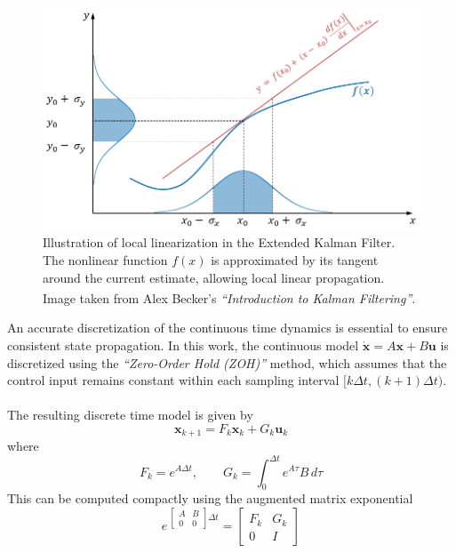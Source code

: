 \begin{figure}[H]
    \centering
    \includegraphics[width=1.0\linewidth]{Pictures/State_Estimation/Extended_Kalman_Filter/Extended_Kalman_Filter_Illustrated.png}
    \caption{Illustration of local linearization in the Extended Kalman Filter. The nonlinear function $f(x)$ is approximated by its tangent around the current estimate, allowing local linear propagation. Image taken from Alex Becker's \textit{``Introduction to Kalman Filtering''}.\textsuperscript{\cite{extended_kalman_filter}}}
    \label{fig:state-estimation-extended-kalman-filter}
\end{figure}
\noindent
An accurate discretization of the continuous time dynamics is essential to ensure consistent state propagation. In this work, the continuous model $\dot{\mathbf{x}} = A\mathbf{x} + B\mathbf{u}$ is discretized using the \textit{``Zero-Order Hold (ZOH)''} method, which assumes that the control input remains constant within each sampling interval $[k\Delta t, (k+1)\Delta t)$.  
\\ \\
The resulting discrete time model is given by
$$
    \mathbf{x}_{k+1} = F_k\mathbf{x}_k + G_k\mathbf{u}_k
$$
where
$$
    F_k = e^{A\Delta t}, \qquad
    G_k = \int_0^{\Delta t} e^{A\tau}B\,d\tau
$$
This can be computed compactly using the augmented matrix exponential
\begin{equation}
    e\,^{
        \begin{bmatrix}
            A & B \\ 
            0 & 0
        \end{bmatrix}
        \Delta t
        }
    =
    \begin{bmatrix}
        F_k & G_k \\
        0 & I
    \end{bmatrix}
    \label{eq:ZOH}
\end{equation}
